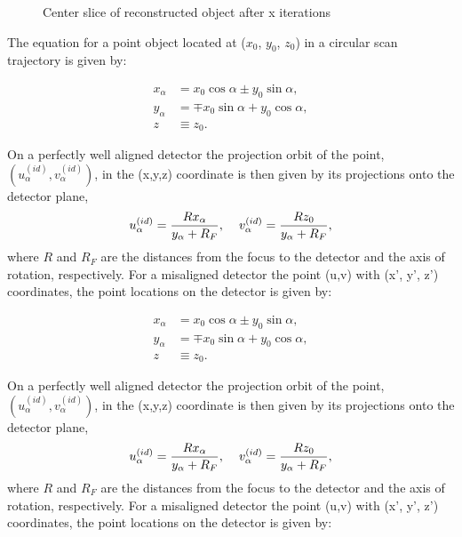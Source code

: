\begin{figure}
\centering
{}
\label{fig:reconstructedimage}
\caption{Center slice of reconstructed object after x iterations}
\end{figure}

The equation for a point object located at ($x_0$, $y_0$, $z_0$) in a circular scan trajectory is given by:

\begin{equation}\label{eq:circularorbit}
\begin{split}
x_{\alpha}& = x_0 \cos \alpha \pm y_0 \sin \alpha, \\
y_{\alpha}& = \mp x_0 \sin \alpha + y_0 \cos \alpha, \\
z& \equiv z_0.
\end{split}
\end{equation}

On a perfectly well aligned detector the projection orbit of the point, $(u_{\alpha}^{(id)}, v_{\alpha}^{(id)})$, in the (x,y,z) coordinate is then given by its projections onto the detector plane, 
\begin{equation}\label{eq:idealUVpoints}
u_{\alpha}^{(id)} = \frac{R x_{\alpha}}{y_{\alpha} + R_F}, \hspace{0.4cm} v_{\alpha}^{(id)} = \frac{Rz_0}{y_{\alpha}+R_F}, 
\end{equation}
where $R$ and $R_F$ are the distances from the focus to the detector and the axis of rotation, respectively.  For a misaligned detector the point (u,v) with (x', y', z') coordinates, the point locations on the detector is given by:


\begin{equation}\label{eq:circularorbit}
\begin{split}
x_{\alpha}& = x_0 \cos \alpha \pm y_0 \sin \alpha, \\
y_{\alpha}& = \mp x_0 \sin \alpha + y_0 \cos \alpha, \\
z& \equiv z_0.
\end{split}
\end{equation}

On a perfectly well aligned detector the projection orbit of the point, $(u_{\alpha}^{(id)}, v_{\alpha}^{(id)})$, in the (x,y,z) coordinate is then given by its projections onto the detector plane, 
\begin{equation}\label{eq:idealUVpoints}
u_{\alpha}^{(id)} = \frac{R x_{\alpha}}{y_{\alpha} + R_F}, \hspace{0.4cm} v_{\alpha}^{(id)} = \frac{Rz_0}{y_{\alpha}+R_F}, 
\end{equation}
where $R$ and $R_F$ are the distances from the focus to the detector and the axis of rotation, respectively.  For a misaligned detector the point (u,v) with (x', y', z') coordinates, the point locations on the detector is given by:

